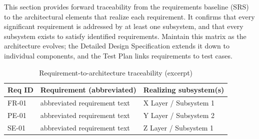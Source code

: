This section provides forward traceability from the requirements baseline (SRS) to the architectural elements that realize each requirement. It confirms that every significant requirement is addressed by at least one subsystem, and that every subsystem exists to satisfy identified requirements. Maintain this matrix as the architecture evolves; the Detailed Design Specification extends it down to individual components, and the Test Plan links requirements to test cases.

\begin{table}[H]
\caption{Requirement-to-architecture traceability (excerpt)}
\begin{center}
    \begin{tabular}{ | p{2cm} | p{5.5cm} | p{5cm} |}
    \hline
    \textbf{Req ID} & \textbf{Requirement (abbreviated)} & \textbf{Realizing subsystem(s)} \\ \hline
    FR-01 & abbreviated requirement text & X Layer / Subsystem 1 \\ \hline
    PE-01 & abbreviated requirement text & Y Layer / Subsystem 2 \\ \hline
    SE-01 & abbreviated requirement text & Z Layer / Subsystem 1 \\ \hline
    \end{tabular}
\end{center}
\end{table}
